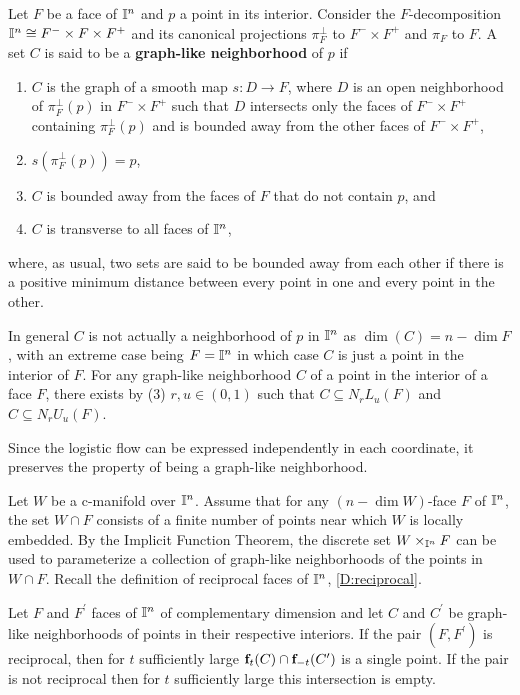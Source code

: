 \begin{definition}\label{D:graph-like}
	Let $F$ be a face of $\mathbb{I}^n$ and $p$ a point in its interior.
	Consider the $F$-decomposition $\mathbb{I}^n \cong F^- \times F \times F^+$ and its canonical projections $\pi_F^{\perp}$ to $F^- \times F^+$ and $\pi_F$ to $F$.
	A set $C$ is said to be a \textbf{graph-like neighborhood} of $p$ if
	\begin{enumerate}
		\item $C$ is the graph of a smooth map $s \colon D \to F$, where $D$ is an open neighborhood of $\pi_F^\perp(p)$ in $F^- \times F^+$ such that $D$ intersects only the faces of $F^- \times F^+$ containing $\pi_F^\perp(p)$ and is bounded away from the other faces of $F^- \times F^+$,
		\item $s(\pi_F^\perp(p)) = p$,
		\item $C$ is bounded away from the faces of $F$ that do not contain $p$, and
		\item $C$ is transverse to all faces of $\mathbb{I}^n$,
	\end{enumerate}
	where, as usual, two sets are said to be bounded away from each other if there is a positive minimum distance between every point in one and every point in the other.
\end{definition}

In general $C$ is not actually a neighborhood of $p$ in $\mathbb{I}^n$ as $\dim(C)=n-\dim F$, with an extreme case being $F =\mathbb{I}^n$ in which case $C$ is just a point in the interior of $F$.
For any graph-like neighborhood $C$ of a point in the interior of a face $F$, there exists by (3) $r, u \in (0,1)$ such that $C \subseteq N_rL_u(F)$ and $C \subseteq N_rU_u(F)$.

Since the logistic flow can be expressed independently in each coordinate, it preserves the property of being a graph-like neighborhood.

Let $W$ be a c-manifold over $\mathbb{I}^n$.
Assume that for any $(n-\dim W)$-face $F$ of $\mathbb{I}^n$, the set $W \cap F$ consists of a finite number of points near which $W$ is locally embedded.
By the Implicit Function Theorem, the discrete set $W \times_{\mathbb{I}^n} F$ can be used to parameterize a collection of graph-like neighborhoods of the points in $W \cap F$.
Recall the definition of reciprocal faces of $\mathbb{I}^n$, \cref{D:reciprocal}.

\begin{lemma}\label{L:flow intersection for graph-like nbhds}
	Let $F$ and $F^\prime$ faces of $\mathbb{I}^n$ of complementary dimension and let $C$ and $C^\prime$ be graph-like neighborhoods of points in their respective interiors.
	If the pair $(F,F^\prime)$ is reciprocal, then for $t$ sufficiently large $\mathbf{f}_t(C) \cap \mathbf{f}_{-t}(C^\prime)$ is a single point.
	If the pair is not reciprocal then for $t$ sufficiently large this intersection is empty.
\end{lemma}

